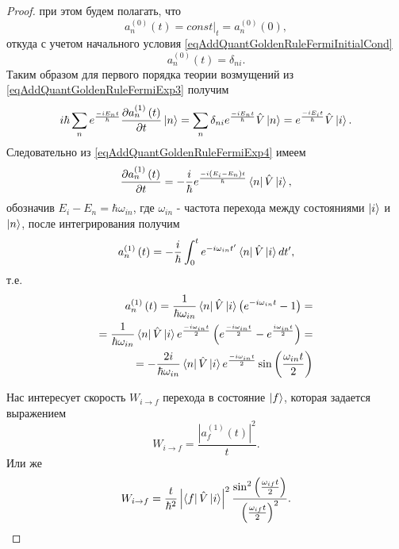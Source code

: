 \begin{proof}
  при этом будем полагать, что
  \[
  a_n^{(0)}\left(t\right) = \left.const\right|_t = a_n^{(0)}\left(0\right),
  \]
  откуда с учетом начального условия
  \eqref{eqAddQuantGoldenRuleFermiInitialCond}
  \[
  a_n^{(0)}\left(t\right) = \delta_{ni}.
  \]
  Таким образом для первого порядка теории возмущений из
  \eqref{eqAddQuantGoldenRuleFermiExp3} получим
  \begin{eqnarray}
    i \hbar \sum_n  e^{\frac{-i E_n t}{\hbar}}
    \frac{ \partial a_n^{(1)}\left(t\right)}{\partial t } \ket{n} =
     \sum_n  \delta_{ni} 
     e^{\frac{-i E_n t}{\hbar}} \hat{V} \ket{n} =
     e^{\frac{-i E_i t}{\hbar}} \hat{V} \ket{i}.
    \label{eqAddQuantGoldenRuleFermiExp4}
  \end{eqnarray}
  Следовательно из \eqref{eqAddQuantGoldenRuleFermiExp4} имеем
  \begin{equation}
    \frac{ \partial a_n^{(1)}\left(t\right)}{\partial t }  =
    - \frac{i}{\hbar} e^{\frac{-i \left(E_i - E_n\right) t}{\hbar}}
    \bra{n}\hat{V}\ket{i},
    \nonumber
  \end{equation}
  обозначив $E_i - E_n = \hbar \omega_{in}$, где $\omega_{in}$ -
  частота перехода между состояниями $\ket{i}$ и
  $\ket{n}$, после интегрирования получим
  \begin{equation}
  a_n^{(1)}\left(t\right)  =
    - \frac{i}{\hbar} \int_0^t e^{-i \omega_{in} t'}
    \bra{n}\hat{V}\ket{i} dt',
    \nonumber
  \end{equation}
  т.е.
  \begin{eqnarray}
  a_n^{(1)}\left(t\right)  =
  \frac{1}{\hbar \omega_{in}} \bra{n}\hat{V}\ket{i}
  \left(e^{-i \omega_{in} t} -  1\right) =
  \\ \nonumber =
  \frac{1}{\hbar \omega_{in}} \bra{n}\hat{V}\ket{i}
  e^{\frac{-i \omega_{in} t}{2}}
  \left(e^{\frac{-i \omega_{in} t}{2}} -  e^{\frac{i \omega_{in}
      t}{2}}\right) =
  \\ \nonumber
  =
  - \frac{2 i}{\hbar \omega_{in}} \bra{n}\hat{V}\ket{i}
  e^{\frac{-i \omega_{in} t}{2}}
  \sin\left(\frac{ \omega_{in} t}{2}\right)
  \nonumber
  \end{eqnarray}
  
  
  Нас интересует скорость $W_{i \rightarrow f}$ перехода в
  состояние $\ket{f}$, которая задается выражением
  \[
  W_{i \rightarrow f} = \frac{\left|a_f^{(1)}\left(t\right)\right|^2}{t}.
  \]
  Или же
  \begin{eqnarray}
    W_{i \rightarrow f} =
    \frac{t}{\hbar^2}
    \left|\bra{f}\hat{V}\ket{i}\right|^2
    \frac{\sin^2\left(\frac{ \omega_{if} t}{2}\right)}
         {\left(\frac{ \omega_{if} t}{2}\right)^2}.
    \label{eqAddQuantGoldenRuleFermiExp5}
  \end{eqnarray}


\end{proof}

